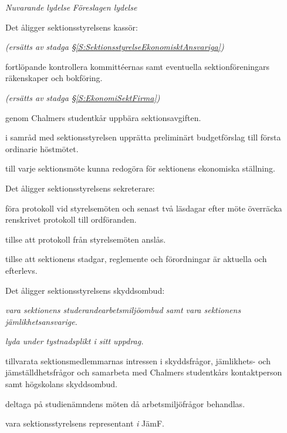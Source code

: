 \documentclass{article}
\newenvironment{lydelse}
    {\begin{paracol}{2}%
        \emph{Nuvarande lydelse}%
        \switchcolumn%
        \emph{Föreslagen lydelse}%
    \end{paracol}%
    \begin{enumerate}[label=\thesubsection.\arabic*]%
    \begin{paracol}{2}%
    }{\end{paracol}\end{enumerate}}
\begin{document}
\begin{lydelse}
    \item Det åligger sektionsstyrelsens  kassör:
    \begin{aligganden}
        \vspace{-0.2em}
        \item[] \emph{(ersätts av stadga \S \ref{S:SektionsstyrelseEkonomisktAnsvariga})}\vspace{1.4em}
        \item fortlöpande kontrollera kommittéernas samt eventuella sektionföreningars räkenskaper och bokföring.\vspace{0.2em}
        \item[] \emph{(ersätts av stadga \S \ref{S:EkonomiSektFirma})}\vspace{0.2em}
        \item genom Chalmers studentkår uppbära sektionsavgiften.
        \item i samråd med sektionsstyrelsen upprätta preliminärt budgetförslag till första ordinarie höstmötet.
        \item till varje sektionsmöte kunna redogöra för sektionens ekonomiska ställning.
    \end{aligganden}
    
    \vspace{-0.1em}
    \item Det åligger sektionsstyrelsens sekreterare:\vspace{-0.4em}
    \begin{aligganden}
        \item föra protokoll vid styrelsemöten och senast två läsdagar efter möte överräcka renskrivet protokoll till ordföranden.\vspace{0.3em}
        \item tillse att protokoll från styrelsemöten anslås.\vspace{0.2em}
        \item tillse att sektionens stadgar, reglemente och förordningar är aktuella och efterlevs.
    \end{aligganden}
    
    \vspace{-0.2em}
    \item Det åligger sektionsstyrelsens skyddsombud:
    \begin{aligganden}
        \item \emph{vara sektionens studerandearbetsmiljöombud samt vara sektionens jämlikhetsansvarige.}
        \item \emph{lyda under tystnadsplikt i sitt uppdrag.}\vspace{0.8em}
        \item tillvarata sektionsmedlemmarnas intressen i skyddsfrågor, jämlikhets- och jämställdhetsfrågor och samarbeta med Chalmers studentkårs kontaktperson samt högskolans skyddsombud.\vspace{0.2em}
        \item deltaga på studienämndens möten då arbetsmiljöfrågor behandlas.
        \item vara sektionsstyrelsens representant \emph{i} JämF.
    \end{aligganden}
    

\end{lydelse}
\end{document}
